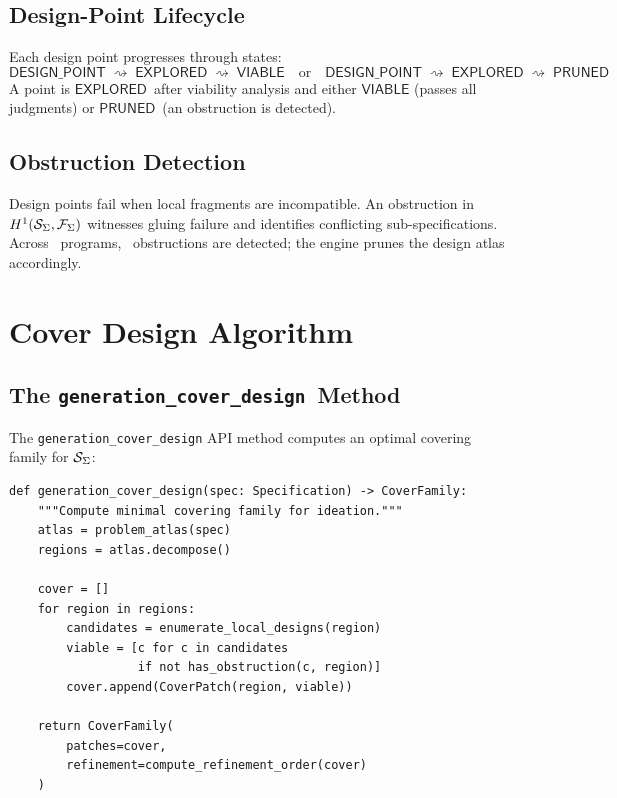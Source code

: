 \documentclass[11pt]{article}
\newcommand{\DesignPoint}{\ensuremath{\mathsf{DESIGN\_POINT}}}
\newcommand{\Explored}{\ensuremath{\mathsf{EXPLORED}}}
\newcommand{\Viable}{\ensuremath{\mathsf{VIABLE}}}
\newcommand{\Pruned}{\ensuremath{\mathsf{PRUNED}}}
\newcommand{\GenCover}{\texttt{generation\_cover\_design}}
\newcommand{\designarrow}{\rightsquigarrow}
\begin{document}
\subsection{Design-Point Lifecycle}
Each design point progresses through states:
\[
  \DesignPoint \;\designarrow\; \Explored \;\designarrow\; \Viable
  \quad\text{or}\quad \DesignPoint \;\designarrow\; \Explored
  \;\designarrow\; \Pruned
\]
A point is \Explored\ after viability analysis and either \Viable
(passes all judgments) or \Pruned\ (an obstruction is detected).

\subsection{Obstruction Detection}
Design points fail when local fragments are incompatible.  An
obstruction in $H^{1}(\mathcal{S}_\Sigma, \mathcal{F}_\Sigma)$ witnesses
gluing failure and identifies conflicting sub-specifications.  Across
\expTotalPrograms\ programs, \expObstructionTotal\ obstructions are
detected; the engine prunes the design atlas accordingly.

\section{Cover Design Algorithm}\label{sec:cover-design}

\subsection{The \GenCover\ Method}
The \texttt{generation\_cover\_design} API method computes an optimal
covering family for $\mathcal{S}_\Sigma$:

\begin{lstlisting}[style=jugeo-python]
def generation_cover_design(spec: Specification) -> CoverFamily:
    """Compute minimal covering family for ideation."""
    atlas = problem_atlas(spec)
    regions = atlas.decompose()
    
    cover = []
    for region in regions:
        candidates = enumerate_local_designs(region)
        viable = [c for c in candidates
                  if not has_obstruction(c, region)]
        cover.append(CoverPatch(region, viable))
    
    return CoverFamily(
        patches=cover,
        refinement=compute_refinement_order(cover)
    )
\end{lstlisting}
\end{document}
